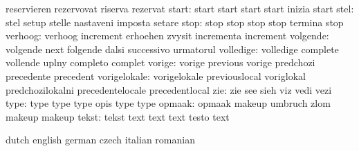                            reservieren               rezervovat
                           riserva                   rezervat
                    start: start                     start
                           start                     start
                           inizia                    start
                     stel: stel                      setup
                           stelle                    nastaveni
                           imposta                   setare
                     stop: stop                      stop
                           stop                      stop
                           termina                   stop
                  verhoog: verhoog                   increment
                           erhoehen                  zvysit
                           incrementa                increment
                 volgende: volgende                  next
                           folgende                  dalsi
                           successivo                urmatorul
                volledige: volledige                 complete
                           vollende                  uplny
                           completo                  complet
                   vorige: vorige                    previous
                           vorige                    predchozi
                           precedente                precedent
             vorigelokale: vorigelokale              previouslocal
                           voriglokal                predchozilokalni
                           precedentelocale          precedentlocal
                      zie: zie                       see
                           sieh                      viz
                           vedi                      vezi
                     type: type                      type
                           type                      opis
                           type                      type %
                   opmaak: opmaak                    makeup
                           umbruch                   zlom
                           makeup                    makeup %
                    tekst: tekst                     text
                           text                      text
                           testo                     text

\stopelements


\startvariables            dutch                     english
                           german                    czech
                           italian                   romanian

